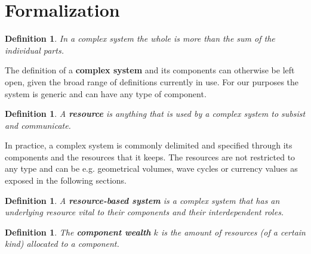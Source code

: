 \documentclass[a4paper, 11pt]{article} %
\newtheorem{definition2}[theorem3]{Definition}
\begin{document}
\section{Formalization}\label{sec:form}

\begin{definition2}
In a complex system the whole is more than the sum of the individual parts.
\end{definition2}

The definition of a {\bf complex system} and its components 
can otherwise be left open, given the broad range of definitions currently in use. For our purposes the system is generic and can have any type of component.


\begin{definition2}
	A {\bf resource} is anything that is used by a complex system to subsist and communicate.
\end{definition2}

In practice, a complex system is commonly delimited and specified through its components and the resources that it keeps. The resources are not restricted to any type and can be e.g. geometrical volumes, wave cycles or currency values as exposed in the following sections.

\begin{definition2}
	A {\bf resource-based system} is a complex system that has an underlying resource vital to their components and their interdependent roles.
\end{definition2}


\begin{definition2}
	The {\bf component wealth} $k$ is the amount of resources (of a certain kind) allocated to a component.
\end{definition2}
\end{document}
